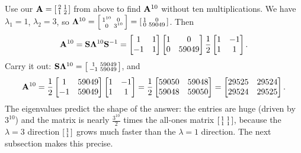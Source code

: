 \begin{example}
\label{ch24:power-example}
Use our $\mathbf{A} = \begin{bsmallmatrix} 2&1\\1&2\end{bsmallmatrix}$ from above to
find $\mathbf{A}^{10}$ without ten multiplications. We have $\lambda_1=1$,
$\lambda_2=3$, so $\mathbf{\Lambda}^{10} = \begin{bsmallmatrix} 1^{10}&0\\0&3^{10}\end{bsmallmatrix}
= \begin{bsmallmatrix} 1 & 0 \\ 0 & 59049 \end{bsmallmatrix}$. Then
\[
  \mathbf{A}^{10}
  = \mathbf{S}\mathbf{\Lambda}^{10}\mathbf{S}^{-1}
  = \begin{bmatrix} 1 & 1 \\ -1 & 1 \end{bmatrix}
    \begin{bmatrix} 1 & 0 \\ 0 & 59049 \end{bmatrix}
    \frac{1}{2}\begin{bmatrix} 1 & -1 \\ 1 & 1 \end{bmatrix}.
\]
Carry it out: $\mathbf{S}\mathbf{\Lambda}^{10} = \begin{bsmallmatrix} 1 & 59049 \\ -1 & 59049 \end{bsmallmatrix}$, and
\[
  \mathbf{A}^{10}
  = \frac{1}{2}\begin{bmatrix} 1 & 59049 \\ -1 & 59049 \end{bmatrix}\begin{bmatrix} 1 & -1 \\ 1 & 1 \end{bmatrix}
  = \frac{1}{2}\begin{bmatrix} 59050 & 59048 \\ 59048 & 59050 \end{bmatrix}
  = \begin{bmatrix} 29525 & 29524 \\ 29524 & 29525 \end{bmatrix}.
\]
The eigenvalues predict the shape of the answer: the entries are huge (driven by
$3^{10}$) and the matrix is nearly $\tfrac{3^{10}}{2}$ times the all-ones matrix
$\begin{bsmallmatrix} 1&1\\1&1\end{bsmallmatrix}$, because the $\lambda=3$
direction $\begin{bsmallmatrix}1\\1\end{bsmallmatrix}$ grows much faster than the $\lambda=1$ direction. The
next subsection makes this precise.
\end{example}

